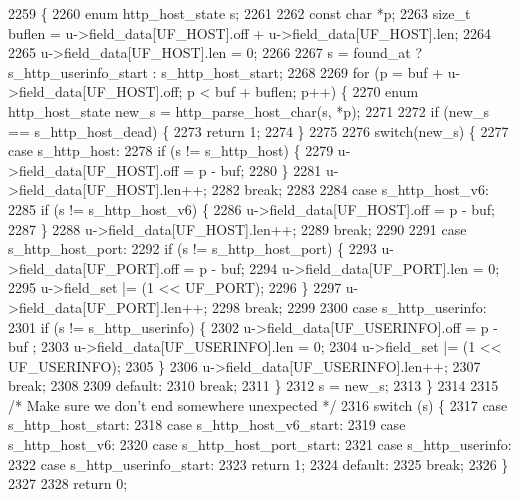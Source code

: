 \begin{DoxyCode}
2259                                                                            \{
2260   \textcolor{keyword}{enum} http_host_state s;
2261 
2262   \textcolor{keyword}{const} \textcolor{keywordtype}{char} *p;
2263   \textcolor{keywordtype}{size\_t} buflen = u->field_data[UF_HOST].off + u->field_data[UF_HOST].len;
2264 
2265   u->field_data[UF_HOST].len = 0;
2266 
2267   s = found\_at ? s_http_userinfo_start : s_http_host_start;
2268 
2269   \textcolor{keywordflow}{for} (p = buf + u->field_data[UF_HOST].off; p < buf + buflen; p++) \{
2270     \textcolor{keyword}{enum} http_host_state new\_s = http_parse_host_char(s, *p);
2271 
2272     \textcolor{keywordflow}{if} (new\_s == s_http_host_dead) \{
2273       \textcolor{keywordflow}{return} 1;
2274     \}
2275 
2276     \textcolor{keywordflow}{switch}(new\_s) \{
2277       \textcolor{keywordflow}{case} s_http_host:
2278         \textcolor{keywordflow}{if} (s != s_http_host) \{
2279           u->field_data[UF_HOST].off = p - buf;
2280         \}
2281         u->field_data[UF_HOST].len++;
2282         \textcolor{keywordflow}{break};
2283 
2284       \textcolor{keywordflow}{case} s_http_host_v6:
2285         \textcolor{keywordflow}{if} (s != s_http_host_v6) \{
2286           u->field_data[UF_HOST].off = p - buf;
2287         \}
2288         u->field_data[UF_HOST].len++;
2289         \textcolor{keywordflow}{break};
2290 
2291       \textcolor{keywordflow}{case} s_http_host_port:
2292         \textcolor{keywordflow}{if} (s != s_http_host_port) \{
2293           u->field_data[UF_PORT].off = p - buf;
2294           u->field_data[UF_PORT].len = 0;
2295           u->field_set |= (1 << UF_PORT);
2296         \}
2297         u->field_data[UF_PORT].len++;
2298         \textcolor{keywordflow}{break};
2299 
2300       \textcolor{keywordflow}{case} s_http_userinfo:
2301         \textcolor{keywordflow}{if} (s != s_http_userinfo) \{
2302           u->field_data[UF_USERINFO].off = p - buf ;
2303           u->field_data[UF_USERINFO].len = 0;
2304           u->field_set |= (1 << UF_USERINFO);
2305         \}
2306         u->field_data[UF_USERINFO].len++;
2307         \textcolor{keywordflow}{break};
2308 
2309       \textcolor{keywordflow}{default}:
2310         \textcolor{keywordflow}{break};
2311     \}
2312     s = new\_s;
2313   \}
2314 
2315   \textcolor{comment}{/* Make sure we don't end somewhere unexpected */}
2316   \textcolor{keywordflow}{switch} (s) \{
2317     \textcolor{keywordflow}{case} s_http_host_start:
2318     \textcolor{keywordflow}{case} s_http_host_v6_start:
2319     \textcolor{keywordflow}{case} s_http_host_v6:
2320     \textcolor{keywordflow}{case} s_http_host_port_start:
2321     \textcolor{keywordflow}{case} s_http_userinfo:
2322     \textcolor{keywordflow}{case} s_http_userinfo_start:
2323       \textcolor{keywordflow}{return} 1;
2324     \textcolor{keywordflow}{default}:
2325       \textcolor{keywordflow}{break};
2326   \}
2327 
2328   \textcolor{keywordflow}{return} 0;
\end{DoxyCode}
